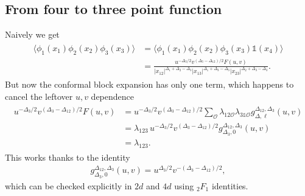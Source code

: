 \documentclass[letterpaper]{article}
\let\Oldsubsection\subsection
\renewcommand{\subsection}{\FloatBarrier\Oldsubsection}
\def\Om{{\mathcal{O}}}
\begin{document}
\subsection{From four to three point function}

Naively we get
\begin{align}
\begin{split}
  \langle \phi_1(x_1) \phi_2(x_2) \phi_3(x_3) \rangle
& = \langle \phi_1(x_1) \phi_2(x_2) \phi_3(x_3) \mathds{1}(x_4) \rangle \\
& = \frac{u^{-\Delta_3/2} v^{(\Delta_3-\Delta_{12})/2} F(u, v)}{
      |x_{12}|^{\Delta_1+\Delta_2-\Delta_3}
      |x_{13}|^{\Delta_1+\Delta_3-\Delta_3}
      |x_{23}|^{\Delta_2+\Delta_3-\Delta_3}
    }.
\end{split}
\end{align}
But now the conformal block expansion has only one term, which happens to cancel the leftover $u,v$ dependence 
\begin{align}
\begin{split}
 u^{-\Delta_3/2} v^{(\Delta_3-\Delta_{12})/2} F(u, v)
 & = u^{-\Delta_3/2} v^{(\Delta_3-\Delta_{12})/2} \sum_\Om \lambda_{12\Om}   
     \lambda_{3\mathds{1}\Om} g_{\Delta, \ell}^{\Delta_{12}, \Delta_3}(u, v) \\
 & = \lambda_{123} \, u^{-\Delta_3/2} v^{(\Delta_3-\Delta_{12})/2} 
     g_{\Delta_3, 0}^{\Delta_{12}, \Delta_3}(u, v) \\
 & = \lambda_{123}.
\end{split}
\end{align}
This works thanks to the identity
\begin{align}
 g_{\Delta_3, 0}^{\Delta_{12}, \Delta_3}(u, v) 
 = u^{\Delta_3/2} v^{-(\Delta_3-\Delta_{12})/2},
\end{align}
which can be checked explicitly in $2d$ and $4d$ using ${}_2F_1$ identities.
\end{document}
